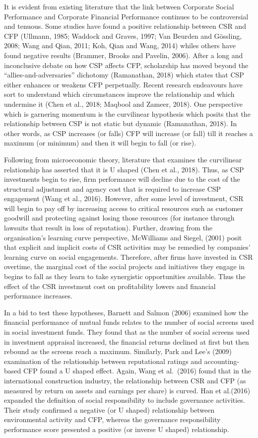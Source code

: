 \documentclass[
]{mitthesis}
\begin{document}
It is evident from existing literature that the link between Corporate Social Performance and Corporate Financial Performance continues to be controversial and tenuous. Some studies have found a positive relationship between CSR and CFP (Ullmann, 1985; Waddock and Graves, 1997; Van Beurden and Gössling, 2008; Wang and Qian, 2011; Koh, Qian and Wang, 2014) whiles others have found negative results (Brammer, Brooks and Pavelin, 2006). After a long and inconclusive debate on how CSP affects CFP, scholarship has moved beyond the ``allies-and-adversaries'' dichotomy (Ramanathan, 2018) which states that CSP either enhances or weakens CFP perpetually. Recent research endeavours have sort to understand which circumstances improve the relationship and which undermine it (Chen et al., 2018; Maqbool and Zameer, 2018). One perspective which is garnering momentum is the curvilinear hypothesis which posits that the relationship between CSP is not static but dynamic (Ramanathan, 2018). In other words, as CSP increases (or falls) CFP will increase (or fall) till it reaches a maximum (or minimum) and then it will begin to fall (or rise).

Following from microeconomic theory, literature that examines the curvilinear relationship has asserted that it is U shaped (Chen et al., 2018). Thus, as CSP investments begin to rise, firm performance will decline due to the cost of the structural adjustment and agency cost that is required to increase CSP engagement (Wang et al., 2016). However, after some level of investment, CSR will begin to pay off by increasing access to critical resources such as customer goodwill and protecting against losing those resources (for instance through lawsuits that result in loss of reputation). Further, drawing from the organisation's learning curve perspective, McWilliams and Siegel, (2001) posit that explicit and implicit costs of CSR activities may be remedied by companies' learning curve on social engagements. Therefore, after firms have invested in CSR overtime, the marginal cost of the social projects and initiatives they engage in begins to fall as they learn to take synergistic opportunities available. Thus the effect of the CSR investment cost on profitability lowers and financial performance increases.

In a bid to test these hypotheses, Barnett and Salmon (2006) examined how the financial performance of mutual funds relates to the number of social screens used in social investment funds. They found that as the number of social screens used in investment appraisal increased, the financial returns declined at first but then rebound as the screens reach a maximum. Similarly, Park and Lee's (2009) examination of the relationship between reputational ratings and accounting-based CFP found a U shaped effect. Again, Wang et al.~(2016) found that in the international construction industry, the relationship between CSR and CFP (as measured by return on assets and earnings per share) is curved. Han et al.(2016) expanded the definition of social responsibility to include governance activities. Their study confirmed a negative (or U shaped) relationship between environmental activity and CFP, whereas the governance responsibility performance score presented a positive (or inverse U shaped) relationship.
\end{document}
